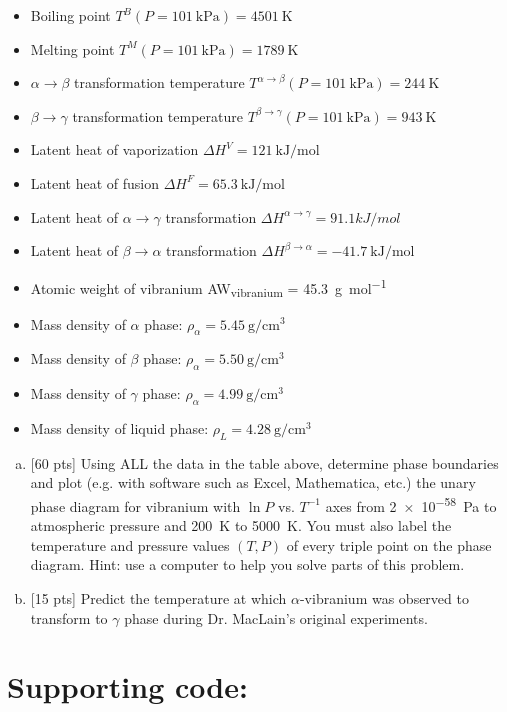 \begin{enumerate}
    \begin{itemize}
      \item Boiling point $T^B(P = \SI{101}{\kilo\pascal}) = \SI{4501}{\kelvin}$
      \item Melting point $T^M(P = \SI{101}{\kilo\pascal}) = \SI{1789}{\kelvin}$
      \item $\alpha \rightarrow \beta$ transformation temperature
        $T^{\alpha\rightarrow\beta}(P = \SI{101}{\kilo\pascal}) =
        \SI{244}{\kelvin}$
      \item $\beta\rightarrow\gamma$ transformation temperature
        $T^{\beta\rightarrow\gamma}(P = \SI{101}{\kilo\pascal}) =
        \SI{943}{\kelvin}$
      \item Latent heat of vaporization $\Delta H^V =
        \SI{121}{\kilo\joule\per\mole}$
      \item Latent heat of fusion $\Delta H^F =
        \SI{65.3}{\kilo\joule\per\mole}$
      \item Latent heat of $\alpha \rightarrow \gamma$ transformation
        $\Delta H^{\alpha\rightarrow\gamma} = 91.1 kJ/mol$
      \item Latent heat of $\beta\rightarrow\alpha$ transformation
        $\Delta H^{\beta\rightarrow\alpha} =
        \SI{-41.7}{\kilo\joule\per\mole}$
      \item Atomic weight of vibranium AW\textsubscript{vibranium} =
        \SI{45.3}{\gram\per\mole}
      \item Mass density of $\alpha$ phase: $\rho_\alpha =
        \SI{5.45}{\gram\per\centi\meter\cubed}$
      \item Mass density of $\beta$ phase: $\rho_\alpha =
        \SI{5.50}{\gram\per\centi\meter\cubed}$
      \item Mass density of $\gamma$ phase: $\rho_\alpha =
        \SI{4.99}{\gram\per\centi\meter\cubed}$
      \item Mass density of liquid phase: $\rho_L =
        \SI{4.28}{\gram\per\centi\meter\cubed}$
    \end{itemize}

    \begin{enumerate}[(a)]
      \item {[60 pts]} Using ALL the data in the table above,
        determine phase boundaries and plot (e.g. with
        software such as Excel, Mathematica, etc.) the unary phase
        diagram for vibranium with $\ln P$
        vs. $T^{-1}$ axes from \SI{2e-58}{Pa} to atmospheric pressure and
        \SI{200}{\kelvin} to \SI{5000}{\kelvin}. You must also
        label the temperature and pressure values $(T,P)$ of every
        triple point on the phase diagram.
        Hint: use a computer to help you solve parts of this problem.
      \item {[15 pts]} Predict the temperature at which
        $\alpha$-vibranium was
        observed to transform to $\gamma$ phase
        during Dr. MacLain’s original experiments.
    \end{enumerate}

\end{enumerate}

\section*{Supporting code:}

\inputminted{julia}{./calculations/src/calculations.jl}


